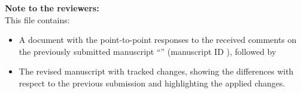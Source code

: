 \documentclass[12pt,a4paper]{article}
\begin{document}
\thispagestyle{empty}
\vspace*{\fill}
\begin{center}
\textbf{\Large Note to the reviewers:}\\[1em]
\large This file contains:
\begin{itemize}
  \item A document with the point-to-point responses to the received comments on the previously submitted manuscript ``\PaperTitle{}'' (manuscript ID \SubmissionID{}), followed by
  \item The revised manuscript with tracked changes, showing the differences with respect to the previous submission and highlighting the applied changes.
\end{itemize}
\end{center}
\vspace*{\fill}
\end{document}
